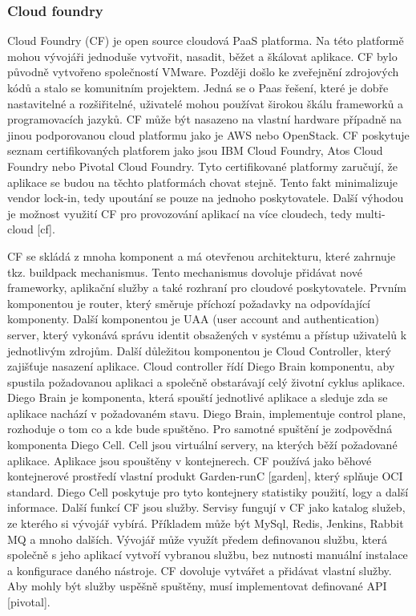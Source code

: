 \subsubsection{Cloud foundry}
Cloud Foundry (CF) je open source cloudová PaaS platforma. Na této platformě mohou vývojáři jednoduše vytvořit, nasadit, běžet a škálovat aplikace. CF bylo původně vytvořeno společností VMware. Později došlo ke zveřejnění zdrojových kódů a stalo se komunitním projektem. Jedná se o Paas řešení, které je dobře nastavitelné a rozšiřitelné, uživatelé mohou používat širokou škálu frameworků a programovacích jazyků. CF může být nasazeno na vlastní hardware případně na jinou podporovanou cloud platformu jako je AWS nebo OpenStack. CF poskytuje seznam certifikovaných platforem jako jsou IBM Cloud Foundry, Atos Cloud Foundry nebo Pivotal Cloud Foundry. Tyto certifikované platformy zaručují, že aplikace se budou na těchto platformách chovat stejně. Tento fakt minimalizuje vendor lock-in, tedy upoutání se pouze na jednoho poskytovatele. Další výhodou je možnost využití CF pro provozování aplikací na více cloudech, tedy multi-cloud [cf].\par
CF se skládá z mnoha komponent a má otevřenou architekturu, které zahrnuje tkz. buildpack mechanismus. Tento mechanismus dovoluje přidávat nové frameworky, aplikační služby a také rozhraní pro cloudové poskytovatele. Prvním komponentou je router, který směruje příchozí požadavky na odpovídající komponenty. Další komponentou je UAA (user account and authentication) server, který vykonává správu identit obsažených v systému a přístup uživatelů k jednotlivým zdrojům. Další důležitou komponentou je Cloud Controller, který zajišťuje nasazení aplikace. Cloud controller řídí Diego Brain komponentu, aby spustila požadovanou aplikaci a společně obstarávají celý životní cyklus aplikace. Diego Brain je komponenta, která spouští jednotlivé aplikace a sleduje zda se aplikace nachází v požadovaném stavu. Diego Brain, implementuje control plane, rozhoduje o tom co a kde bude spuštěno. Pro samotné spuštění je zodpovědná komponenta Diego Cell. Cell jsou virtuální servery, na kterých běží požadované aplikace. Aplikace jsou spouštěny v kontejnerech. CF používá jako běhové kontejnerové prostředí vlastní produkt Garden-runC [garden], který splňuje OCI standard. Diego Cell poskytuje pro tyto kontejnery statistiky použití, logy a další informace. Další funkcí CF jsou služby. Servisy fungují v CF jako katalog služeb, ze kterého si vývojář vybírá. Příkladem může být MySql, Redis, Jenkins, Rabbit MQ a mnoho dalších. Vývojář může využít předem definovanou službu, která společně s jeho aplikací vytvoří vybranou službu, bez nutnosti manuální instalace a konfigurace daného nástroje. CF dovoluje vytvářet a přidávat vlastní služby. Aby mohly být služby uspěšně spuštěny, musí implementovat definované API [pivotal]. \par
